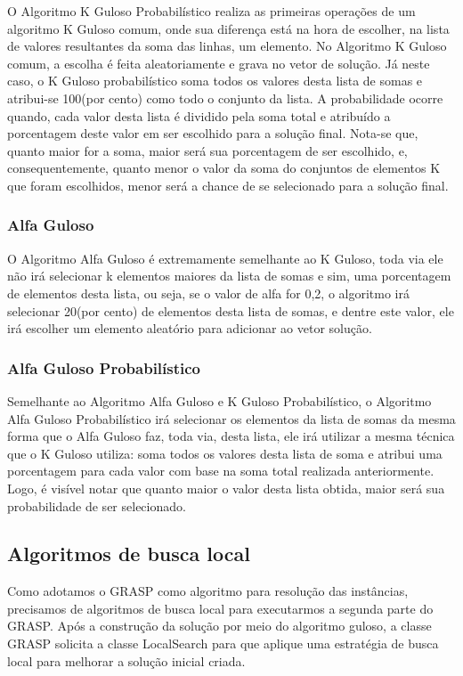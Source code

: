 \documentclass[12pt]{article}
\begin{document}
O Algoritmo K Guloso Probabilístico realiza as primeiras operações de um algoritmo K Guloso comum, onde sua diferença está na hora de escolher, na lista de valores resultantes da soma das linhas, um elemento. No Algoritmo K Guloso comum, a escolha é feita aleatoriamente e grava no vetor de solução. Já neste caso, o K Guloso probabilístico soma todos os valores desta lista de somas e atribui-se 100(por cento) como todo o conjunto da lista. A probabilidade ocorre quando, cada valor desta lista é dividido pela soma total e atribuído a porcentagem deste valor em ser escolhido para a solução final. Nota-se que, quanto maior for a soma, maior será sua porcentagem de ser escolhido, e, consequentemente, quanto menor o valor da soma do conjuntos de elementos K que foram escolhidos, menor será a chance de se selecionado para a solução final.

\subsubsection{Alfa Guloso}

O Algoritmo Alfa Guloso é extremamente semelhante ao K Guloso, toda via ele não irá selecionar k elementos maiores da lista de somas e sim, uma porcentagem de elementos desta lista, ou seja, se o valor de alfa for 0,2, o algoritmo irá selecionar 20(por cento) de elementos desta lista de somas, e dentre este valor, ele irá escolher um elemento aleatório para adicionar ao vetor solução.

\subsubsection{Alfa Guloso Probabilístico}

Semelhante ao Algoritmo Alfa Guloso e K Guloso Probabilístico, o Algoritmo Alfa Guloso Probabilístico irá selecionar os elementos da lista de somas da mesma forma que o Alfa Guloso faz, toda via, desta lista, ele irá utilizar a mesma técnica que o K Guloso utiliza: soma todos os valores desta lista de soma e atribui uma porcentagem para cada valor com base na soma total realizada anteriormente. Logo, é visível notar que quanto maior o valor desta lista obtida, maior será sua probabilidade de ser selecionado.

\subsection{Algoritmos de busca local}
Como adotamos o GRASP como algoritmo para resolução das instâncias, precisamos de algoritmos de busca local para executarmos a segunda parte do GRASP. Após a construção da solução por meio do algoritmo guloso, a classe GRASP solicita a classe LocalSearch para que aplique uma estratégia de busca local para melhorar a solução inicial criada.
\end{document}
